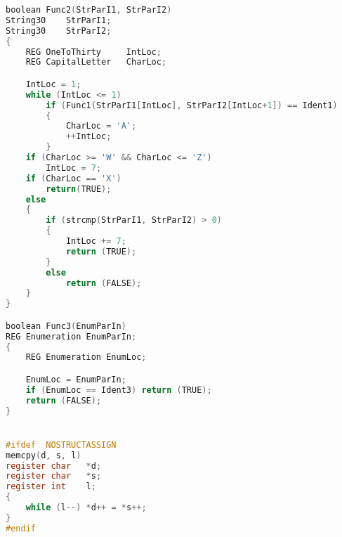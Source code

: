 \begin{lstlisting}[language=C,frame=single,showstringspaces=false,caption={Código fuente del benchmark Dhrystone},label=lst:dhrystone-benchmark]
boolean Func2(StrParI1, StrParI2)
String30	StrParI1;
String30	StrParI2;
{
	REG OneToThirty		IntLoc;
	REG CapitalLetter	CharLoc;

	IntLoc = 1;
	while (IntLoc <= 1)
		if (Func1(StrParI1[IntLoc], StrParI2[IntLoc+1]) == Ident1)
		{
			CharLoc = 'A';
			++IntLoc;
		}
	if (CharLoc >= 'W' && CharLoc <= 'Z')
		IntLoc = 7;
	if (CharLoc == 'X')
		return(TRUE);
	else
	{
		if (strcmp(StrParI1, StrParI2) > 0)
		{
			IntLoc += 7;
			return (TRUE);
		}
		else
			return (FALSE);
	}
}

boolean Func3(EnumParIn)
REG Enumeration	EnumParIn;
{
	REG Enumeration	EnumLoc;

	EnumLoc = EnumParIn;
	if (EnumLoc == Ident3) return (TRUE);
	return (FALSE);
}


#ifdef	NOSTRUCTASSIGN
memcpy(d, s, l)
register char	*d;
register char	*s;
register int	l;
{
	while (l--) *d++ = *s++;
}
#endif
\end{lstlisting}


